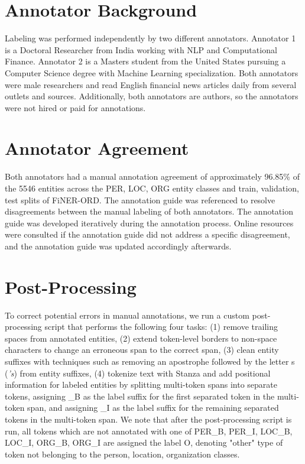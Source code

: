\documentclass[11pt]{article}
\begin{document}
\section{Annotator Background}
\label{app:annotator_background}
Labeling was performed independently by two different annotators. Annotator 1 is a Doctoral Researcher from India working with NLP and Computational Finance. Annotator 2 is a Masters student from the United States pursuing a Computer Science degree with Machine Learning specialization. Both annotators were male researchers and read English financial news articles daily from several outlets and sources. Additionally, both annotators are authors, so the annotators were not hired or paid for annotations.

\section{Annotator Agreement}
\label{app:annotator_aggrement}
Both annotators had a manual annotation agreement of approximately 96.85\% of the 5546 entities across the PER, LOC, ORG entity classes and train, validation, test splits of FiNER-ORD. The annotation guide was referenced to resolve disagreements between the manual labeling of both annotators. The annotation guide was developed iteratively during the annotation process. Online resources were consulted if the annotation guide did not address a specific disagreement, and the annotation guide was updated accordingly afterwards.

\section{Post-Processing}
\label{app:post_process}
To correct potential errors in manual annotations, we run a custom post-processing script that performs the following four tasks: (1) remove trailing spaces from annotated entities, (2) extend token-level borders to non-space characters to change an erroneous span to the correct span, (3) clean entity suffixes with techniques such as removing an apostrophe followed by the letter s (\textit{'s}) from entity suffixes, (4) tokenize text with Stanza \citep{qi-etal-2020-stanza} and add positional information for labeled entities by splitting multi-token spans into separate tokens, assigning \_B as the label suffix for the first separated token in the multi-token span, and assigning \_I as the label suffix for the remaining separated tokens in the multi-token span. We note that after the post-processing script is run, all tokens which are not annotated with one of PER\_B, PER\_I, LOC\_B, LOC\_I, ORG\_B, ORG\_I are assigned the label O, denoting "other" type of token not belonging to the person, location, organization classes.
\end{document}
